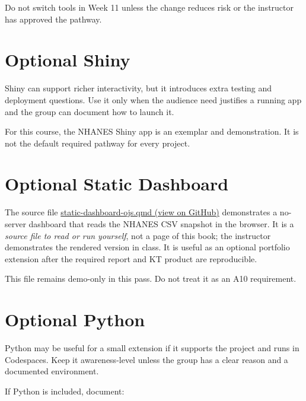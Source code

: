 \documentclass[
  letterpaper,
  DIV=11,
  numbers=noendperiod,
  oneside]{scrreprt}
\begin{document}
Do not switch tools in Week 11 unless the change reduces risk or the
instructor has approved the pathway.

\section*{Optional Shiny}\label{optional-shiny}


Shiny can support richer interactivity, but it introduces extra testing
and deployment questions. Use it only when the audience need justifies a
running app and the group can document how to launch it.

For this course, the NHANES Shiny app is an exemplar and demonstration.
It is not the default required pathway for every project.

\section*{Optional Static Dashboard}\label{optional-static-dashboard}


The source file
\href{https://github.com/ehsanx/HDSx/blob/main/weeks/week11-portfolio-surgery/static-dashboard-ojs.qmd}{static-dashboard-ojs.qmd
(view on GitHub)} demonstrates a no-server dashboard that reads the
NHANES CSV snapshot in the browser. It is a \emph{source file to read or
run yourself}, not a page of this book; the instructor demonstrates the
rendered version in class. It is useful as an optional portfolio
extension after the required report and KT product are reproducible.

This file remains demo-only in this pass. Do not treat it as an A10
requirement.

\section*{Optional Python}\label{optional-python}


Python may be useful for a small extension if it supports the project
and runs in Codespaces. Keep it awareness-level unless the group has a
clear reason and a documented environment.

If Python is included, document:
\end{document}
